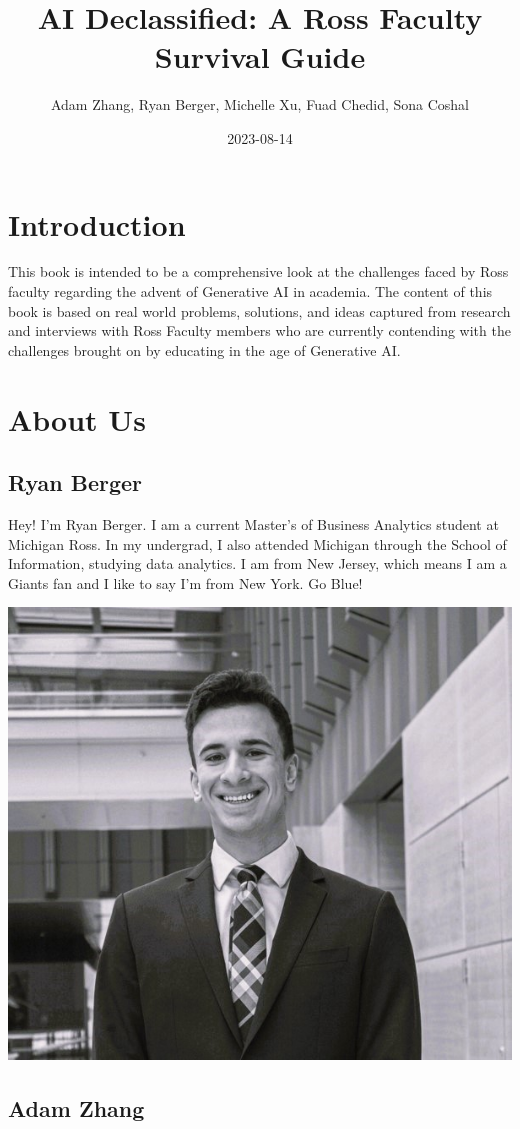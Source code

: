 \documentclass[
]{book}
\title{AI Declassified: A Ross Faculty Survival Guide}
\author{Adam Zhang, Ryan Berger, Michelle Xu, Fuad Chedid, Sona Coshal}
\date{2023-08-14}
\begin{document}
\maketitle

{
\setcounter{tocdepth}{1}
\tableofcontents
}
\hypertarget{introduction}{%
\chapter{Introduction}\label{introduction}}

This book is intended to be a comprehensive look at the challenges faced by Ross faculty regarding the advent of Generative AI in academia. The content of this book is based on real world problems, solutions, and ideas captured from research and interviews with Ross Faculty members who are currently contending with the challenges brought on by educating in the age of Generative AI.

\hypertarget{about-us}{%
\chapter{About Us}\label{about-us}}

\hypertarget{ryan-berger}{%
\section{Ryan Berger}\label{ryan-berger}}

Hey! I'm Ryan Berger. I am a current Master's of Business Analytics student at Michigan Ross. In my undergrad, I also attended Michigan through the School of Information, studying data analytics. I am from New Jersey, which means I am a Giants fan and I like to say I'm from New York. Go Blue!

\includegraphics[width=0.4\linewidth]{rtberger}

\hypertarget{adam-zhang}{%
\section{Adam Zhang}\label{adam-zhang}}
\end{document}
